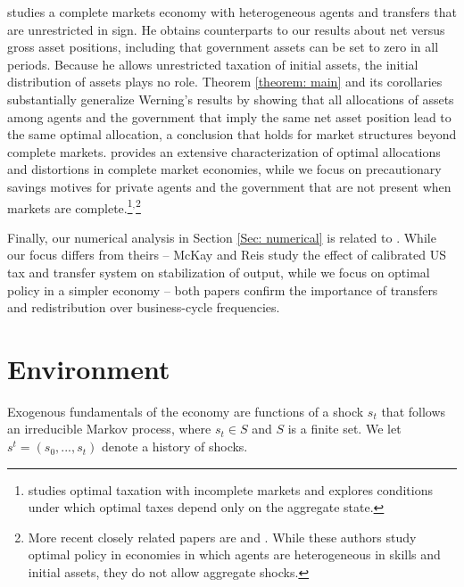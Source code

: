 \documentclass[thmsb,11pt]{article}
\begin{document}
\citet{Wer07a} studies a complete markets economy with heterogeneous agents
and transfers that are unrestricted in sign. He obtains counterparts to our
results about net versus gross asset positions, including that government
assets can be set to zero in all periods. Because he allows unrestricted
taxation of initial assets, the initial distribution of assets plays no
role. Theorem \ref{theorem: main} and its corollaries substantially
generalize Werning's results by showing that all allocations of assets among
agents and the government that imply the same net asset position
lead to the same optimal allocation, a conclusion that holds for market
structures beyond complete markets. \citet{Wer07a} provides an extensive
characterization of optimal allocations and distortions in complete market
economies, while we focus on precautionary savings motives for private
agents and the government that are not present when markets are complete.\footnote{%
\cite{Werning2012} studies optimal taxation with incomplete markets and explores
conditions under which optimal taxes depend only on the aggregate state.}$^,$\footnote{%
More recent closely related papers are \citet{Azzimonti2008,Azzimonti2008a} and \citet{Correia2010}. While these authors study optimal policy in
 economies in which agents are heterogeneous in skills and initial assets, they
  do not allow aggregate shocks.}

  Finally, our numerical analysis in Section \ref{Sec: numerical} is related to \citet{mckay2013}. While our focus differs from theirs -- McKay and Reis study the effect of calibrated US tax and transfer system on stabilization of output, while we focus on optimal policy  in a  simpler economy -- both papers confirm the importance of transfers and redistribution over business-cycle frequencies.




\section{Environment\label{Sec: environment}}

\smallskip  %
Exogenous fundamentals
of the
economy are  functions of a shock  $s_{t}$  that follows an irreducible Markov process, where $s_{t}\in S$ and $S$ is a finite set. We let $s^{t}=\left(
s_{0},...,s_{t}\right) $ denote a history of shocks.
\end{document}
